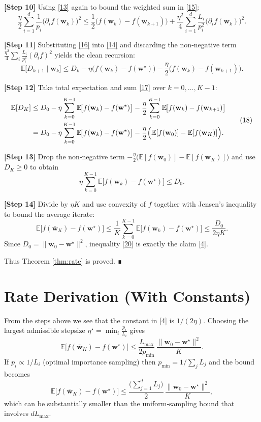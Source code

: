 \documentclass{article}
\newcommand{\E}{\mathbb{E}}
\newcommand{\w}{\mathbf{w}}
\begin{document}
\noindent\textbf{[Step 10]} Using \eqref{13} again to bound the weighted sum in \eqref{15}:
\[
\frac{\eta}{2}\sum_{i=1}^{d}\frac{1}{p_{i}}
          \bigl(\partial_{i}f(\w_{k})\bigr)^{2}
\le \frac{1}{2}\bigl(f(\w_{k})-f(\w_{k+1})\bigr)
   +\frac{\eta^{2}}{4}\sum_{i=1}^{d}\frac{L_{i}}{p_{i}^{2}}
          \bigl(\partial_{i}f(\w_{k})\bigr)^{2}.
\tag{16}
\]

\noindent\textbf{[Step 11]} Substituting \eqref{16} into \eqref{14} and discarding the non‑negative
term $\frac{\eta^{2}}{4}\sum_{i}\frac{L_{i}}{p_{i}^{2}}(\partial_{i}f)^{2}$ yields the clean recursion:
\[
\E\!\bigl[D_{k+1}\mid\w_{k}\bigr]
\le D_{k}
   -\eta\bigl(f(\w_{k})-f(\w^{\star})\bigr)
   -\frac{\eta}{2}\bigl(f(\w_{k})-f(\w_{k+1})\bigr).
\tag{17}
\]

\noindent\textbf{[Step 12]} Take total expectation and sum \eqref{17} over $k=0,\dots,K-1$:
\[
\begin{aligned}
\E[D_{K}]
&\le D_{0}
   -\eta\sum_{k=0}^{K-1}\E\!\bigl[f(\w_{k})-f(\w^{\star})\bigr]
   -\frac{\eta}{2}\sum_{k=0}^{K-1}\E\!\bigl[f(\w_{k})-f(\w_{k+1})\bigr] \\
&= D_{0}
   -\eta\sum_{k=0}^{K-1}\E\!\bigl[f(\w_{k})-f(\w^{\star})\bigr]
   -\frac{\eta}{2}\Bigl(\E[f(\w_{0})]-\E[f(\w_{K})]\Bigr).
\end{aligned}
\tag{18}
\]

\noindent\textbf{[Step 13]} Drop the non‑negative term $-\frac{\eta}{2}\bigl(\E[f(\w_{0})]-\E[f(\w_{K})]\bigr)$
and use $D_{K}\ge0$ to obtain
\[
\eta\sum_{k=0}^{K-1}\E\!\bigl[f(\w_{k})-f(\w^{\star})\bigr]\le D_{0}.
\tag{19}
\]

\noindent\textbf{[Step 14]} Divide by $\eta K$ and use convexity of $f$ together with Jensen’s inequality
to bound the average iterate:
\[
\E\!\bigl[f(\bar{\w}_{K})-f(\w^{\star})\bigr]
\le \frac{1}{K}\sum_{k=0}^{K-1}\E\!\bigl[f(\w_{k})-f(\w^{\star})\bigr]
\le \frac{D_{0}}{2\eta K}.
\tag{20}
\]
Since $D_{0}=\|\w_{0}-\w^{\star}\|^{2}$, inequality \eqref{20} is exactly the claim \eqref{4}.

Thus Theorem \ref{thm:rate} is proved. ∎

\section*{Rate Derivation (With Constants)}
From the steps above we see that the constant in \eqref{4} is $1/(2\eta)$.  
Choosing the largest admissible stepsize $\eta^{\star}= \min_{i}\frac{p_{i}}{L_{i}}$ gives
\[
\E\!\bigl[f(\bar{\w}_{K})-f(\w^{\star})\bigr]
\le
\frac{L_{\max}}{2p_{\min}}\,
\frac{\|\w_{0}-\w^{\star}\|^{2}}{K}.
\]
If $p_{i}\propto 1/L_{i}$ (optimal importance sampling) then $p_{\min}=1/\sum_{j}L_{j}$ and the bound becomes
\[
\E\!\bigl[f(\bar{\w}_{K})-f(\w^{\star})\bigr]
\le
\frac{\bigl(\sum_{j=1}^{d}L_{j}\bigr)}{2}\,
\frac{\|\w_{0}-\w^{\star}\|^{2}}{K},
\]
which can be substantially smaller than the uniform‑sampling bound that involves $dL_{\max}$.
\end{document}
